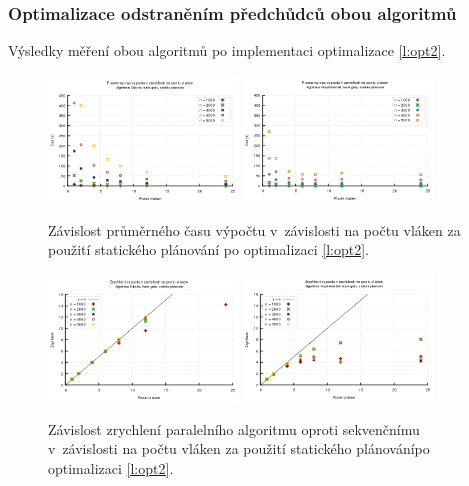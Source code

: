 \subsubsection{Optimalizace odstraněním předchůdců obou algoritmů} \label{l:mer:opt2}
Výsledky měření obou algoritmů po implementaci optimalizace \ref{l:opt2}.

\begin{figure}
    \centering
    \includegraphics[width=0.45\textwidth]{../grafy/02_openMP/02-01-Dijkstra_cas_v3}
    \includegraphics[width=0.45\textwidth]{../grafy/02_openMP/02-01-Floyd_cas_v3}
    \caption{Závislost průměrného času výpočtu v~závislosti na počtu vláken za použití statického plánování po optimalizaci \ref{l:opt2}.}
    \label{f:mer:cas:opt2}
\end{figure}

\begin{figure}
    \centering
    \includegraphics[width=0.45\textwidth]{../grafy/02_openMP/02-02-Dijkstra_zrychleni_v3}
    \includegraphics[width=0.45\textwidth]{../grafy/02_openMP/02-02-Floyd_zrychleni_v3}
    \caption{Závislost zrychlení paralelního algoritmu oproti sekvenčnímu v~závislosti na počtu vláken za použití statického plánovánípo optimalizaci \ref{l:opt2}.}
    \label{f:mer:zry:opt2}
\end{figure}


